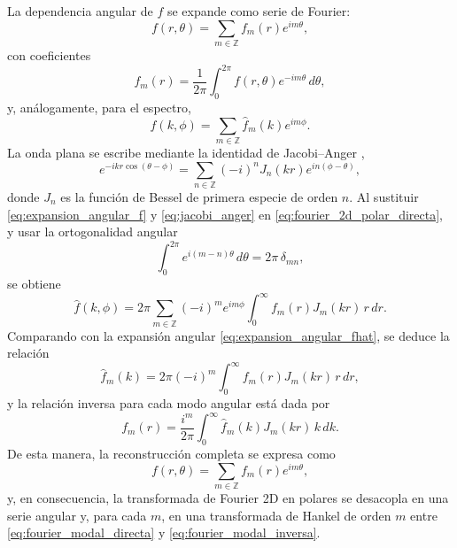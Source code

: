 La dependencia angular de $f$ se expande como serie de Fourier:
\begin{equation}
  f(r,\theta)=\sum_{m\in\mathbb{Z}} f_m(r)e^{im\theta},
  \label{eq:expansion_angular_f}
\end{equation}
con coeficientes
\begin{equation}
  f_m(r)=\frac{1}{2\pi}\int_0^{2\pi} f(r,\theta)e^{-im\theta}\,d\theta,
  \label{eq:coeficientes_angulares_f}
\end{equation}
y, análogamente, para el espectro,
\begin{equation}
  \hat f(k,\phi)=\sum_{m\in\mathbb{Z}} \hat f_m(k)e^{im\phi}.
  \label{eq:expansion_angular_fhat}
\end{equation}
La onda plana se escribe mediante la identidad de Jacobi--Anger \cite{Watson1944},
\begin{equation}
  e^{-ikr\cos(\theta-\phi)}=
  \sum_{n\in\mathbb{Z}}(-i)^nJ_n(kr)e^{in(\phi-\theta)},
  \label{eq:jacobi_anger}
\end{equation}
donde $J_n$ es la función de Bessel de primera especie de orden $n$. Al sustituir \eqref{eq:expansion_angular_f} y \eqref{eq:jacobi_anger} en \eqref{eq:fourier_2d_polar_directa}, y usar la ortogonalidad angular
\begin{equation}
  \int_0^{2\pi} e^{i(m-n)\theta}\,d\theta=2\pi\,\delta_{mn},
\end{equation}
se obtiene
\begin{equation}
  \hat f(k,\phi)=2\pi\sum_{m\in\mathbb{Z}}(-i)^m e^{im\phi}
  \int_0^\infty f_m(r)J_m(kr)\,r\,dr.
\end{equation}
Comparando con la expansión angular \eqref{eq:expansion_angular_fhat}, se deduce la relación
\begin{equation}
  \hat f_m(k)=2\pi(-i)^m\int_0^\infty f_m(r)J_m(kr)\,r\,dr,
  \label{eq:fourier_modal_directa}
\end{equation}
y la relación inversa para cada modo angular está dada por
\begin{equation}
  f_m(r)=\frac{i^m}{2\pi}\int_0^\infty \hat f_m(k)J_m(kr)\,k\,dk.
  \label{eq:fourier_modal_inversa}
\end{equation}
De esta manera, la reconstrucción completa se expresa como
\begin{equation}
  f(r,\theta)=\sum_{m\in\mathbb{Z}} f_m(r)e^{im\theta},
\end{equation}
y, en consecuencia, la transformada de Fourier 2D en polares se desacopla en una serie angular y, para cada $m$, en una transformada de Hankel de orden $m$ entre \eqref{eq:fourier_modal_directa} y \eqref{eq:fourier_modal_inversa}.

